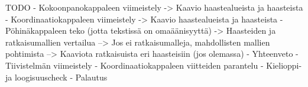     TODO    
- Kokoonpanokappaleen viimeistely
-> Kaavio haastealueista ja haasteista
- Koordinaatiokappaleen viimeistely
-> Kaavio haastealueista ja haasteista
- Pöhinäkappaleen teko (jotta tekstissä on omaäänisyyttä)
-> Haasteiden ja ratkaisumallien vertailua
--> Jos ei ratkaisumalleja, mahdollisten mallien pohtimista
--> Kaaviota ratkaisuista eri haasteisiin (jos olemassa)
- Yhteenveto
- Tiivistelmän viimeistely
- Koordinaatiokappaleen viitteiden parantelu
- Kielioppi- ja loogisuuscheck
- Palautus
